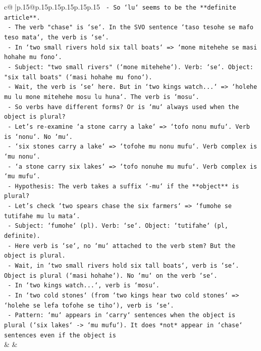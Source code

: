 \documentclass{article}
\begin{document}
{\begin{supertabular}{c@{$\;$}|p{.15\linewidth}@{}p{.15\linewidth}p{.15\linewidth}p{.15\linewidth}p{.15\linewidth}p{.15\linewidth}}
{{{\texttt{      {-} So `lu` seems to be the **definite article**.} \\
\texttt{      {-} The verb "chase" is `se`. In the SVO sentence `taso tesohe se mafo teso mata`, the verb is `se`.} \\
\texttt{      {-} In `two small rivers hold six tall boats` => `mone mitehehe se masi hohahe mu fono`.} \\
\texttt{        {-} Subject: "two small rivers" (`mone mitehehe`). Verb: `se`. Object: "six tall boats" (`masi hohahe mu fono`).} \\
\texttt{        {-} Wait, the verb is `se` here. But in `two kings watch...` => `holehe mu lu mone mitehehe mosu lu huna`. The verb is `mosu`.} \\
\texttt{        {-} So verbs have different forms? Or is `mu` always used when the object is plural?} \\
\texttt{        {-} Let's re{-}examine `a stone carry a lake` => `tofo nonu mufu`. Verb is `nonu`. No `mu`.} \\
\texttt{        {-} `six stones carry a lake` => `tofohe mu nonu mufu`. Verb complex is `mu nonu`.} \\
\texttt{        {-} `a stone carry six lakes` => `tofo nonuhe mu mufu`. Verb complex is `mu mufu`.} \\
\texttt{        {-} Hypothesis: The verb takes a suffix `{-}mu` if the **object** is plural?} \\
\texttt{        {-} Let's check `two spears chase the six farmers` => `fumohe se tutifahe mu lu mata`.} \\
\texttt{          {-} Subject: `fumohe` (pl). Verb: `se`. Object: `tutifahe` (pl, definite).} \\
\texttt{          {-} Here verb is `se`, no `mu` attached to the verb stem? But the object is plural.} \\
\texttt{          {-} Wait, in `two small rivers hold six tall boats`, verb is `se`. Object is plural (`masi hohahe`). No `mu` on the verb `se`.} \\
\texttt{          {-} In `two kings watch...`, verb is `mosu`.} \\
\texttt{          {-} In `two cold stones` (from `two kings hear two cold stones` => `holehe se lefa tofohe se tiho`), verb is `se`.} \\
\texttt{          {-} Pattern: `mu` appears in `carry` sentences when the object is plural (`six lakes` {-}> `mu mufu`). It does *not* appear in `chase` sentences even if the object is} \\
            }
        }
    }
    & & \\ \\


\end{supertabular}}
\end{document}
